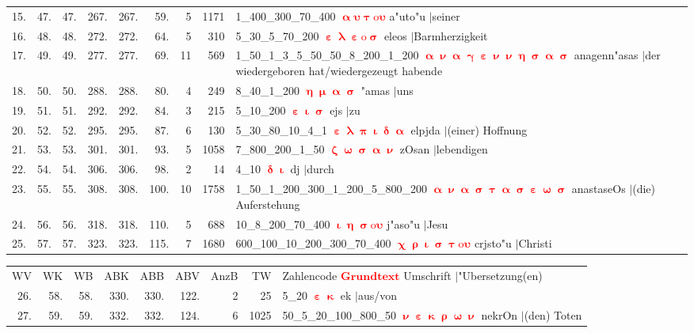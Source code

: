 \documentclass[a4paper,10pt,landscape]{article}
\begin{document}
\begin{tabular}{rrrrrrrrp{120mm}}
15.&47.&47.&267.&267.&59.&5&1171&1\_400\_300\_70\_400 \textcolor{red}{$\boldsymbol{\upalpha\upsilon\uptau\mathrm{o}\upsilon}$} a"uto"u $|$seiner\\
16.&48.&48.&272.&272.&64.&5&310&5\_30\_5\_70\_200 \textcolor{red}{$\boldsymbol{\upepsilon\uplambda\upepsilon\mathrm{o}\upsigma}$} eleos $|$Barmherzigkeit\\
17.&49.&49.&277.&277.&69.&11&569&1\_50\_1\_3\_5\_50\_50\_8\_200\_1\_200 \textcolor{red}{$\boldsymbol{\upalpha\upnu\upalpha\upgamma\upepsilon\upnu\upnu\upeta\upsigma\upalpha\upsigma}$} anagenn"asas $|$der wiedergeboren hat/wiedergezeugt habende\\
18.&50.&50.&288.&288.&80.&4&249&8\_40\_1\_200 \textcolor{red}{$\boldsymbol{\upeta\upmu\upalpha\upsigma}$} "amas $|$uns\\
19.&51.&51.&292.&292.&84.&3&215&5\_10\_200 \textcolor{red}{$\boldsymbol{\upepsilon\upiota\upsigma}$} ejs $|$zu\\
20.&52.&52.&295.&295.&87.&6&130&5\_30\_80\_10\_4\_1 \textcolor{red}{$\boldsymbol{\upepsilon\uplambda\uppi\upiota\updelta\upalpha}$} elpjda $|$(einer) Hoffnung\\
21.&53.&53.&301.&301.&93.&5&1058&7\_800\_200\_1\_50 \textcolor{red}{$\boldsymbol{\upzeta\upomega\upsigma\upalpha\upnu}$} zOsan $|$lebendigen\\
22.&54.&54.&306.&306.&98.&2&14&4\_10 \textcolor{red}{$\boldsymbol{\updelta\upiota}$} dj $|$durch\\
23.&55.&55.&308.&308.&100.&10&1758&1\_50\_1\_200\_300\_1\_200\_5\_800\_200 \textcolor{red}{$\boldsymbol{\upalpha\upnu\upalpha\upsigma\uptau\upalpha\upsigma\upepsilon\upomega\upsigma}$} anastaseOs $|$(die) Auferstehung\\
24.&56.&56.&318.&318.&110.&5&688&10\_8\_200\_70\_400 \textcolor{red}{$\boldsymbol{\upiota\upeta\upsigma\mathrm{o}\upsilon}$} j"aso"u $|$Jesu\\
25.&57.&57.&323.&323.&115.&7&1680&600\_100\_10\_200\_300\_70\_400 \textcolor{red}{$\boldsymbol{\upchi\uprho\upiota\upsigma\uptau\mathrm{o}\upsilon}$} crjsto"u $|$Christi\\
\end{tabular}
\newpage
\begin{tabular}{rrrrrrrrp{120mm}}
WV&WK&WB&ABK&ABB&ABV&AnzB&TW&Zahlencode \textcolor{red}{$\boldsymbol{Grundtext}$} Umschrift $|$"Ubersetzung(en)\\
26.&58.&58.&330.&330.&122.&2&25&5\_20 \textcolor{red}{$\boldsymbol{\upepsilon\upkappa}$} ek $|$aus/von\\
27.&59.&59.&332.&332.&124.&6&1025&50\_5\_20\_100\_800\_50 \textcolor{red}{$\boldsymbol{\upnu\upepsilon\upkappa\uprho\upomega\upnu}$} nekrOn $|$(den) Toten\\
\end{tabular}\medskip \\
\end{document}
